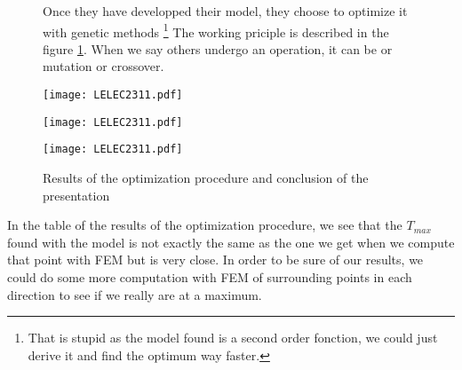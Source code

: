\begin{figure}[H]
    \begin{minipage}{.45\linewidth}
    Once they have developped their model, they choose to optimize it with genetic methods \footnote{That is stupid as the model found is a second order fonction, we could just derive it and find the optimum way faster.}
    The working priciple is described in the figure \ref{fig:61_th slide}. When we say others undergo an operation, it can be or mutation or crossover.
    \end{minipage}
    \hfill%
    \begin{minipage}[c]{.53\linewidth}
        \centering
        \texttt{[image: LELEC2311.pdf]}
        \caption{}
        \label{fig:61_th slide}
    \end{minipage}
\end{figure}

\begin{figure}[H]
    \begin{minipage}{.48\linewidth}
    \centering
        \texttt{[image: LELEC2311.pdf]}
    \end{minipage}
    \hfill%
    \begin{minipage}[c]{.48\linewidth}
        \centering
        \texttt{[image: LELEC2311.pdf]}
        \label{fig:63_th slide}
    \end{minipage}
    \caption{Results of the optimization procedure and conclusion of the presentation}
\end{figure}

In the table of the results of the optimization procedure, we see that the $T_{max}$ found with the model is not exactly the same as the one we get when we compute that point with FEM but is very close. In order to be sure of our results, we could do some more computation with FEM of surrounding points in each direction to see if we really are at a maximum.
